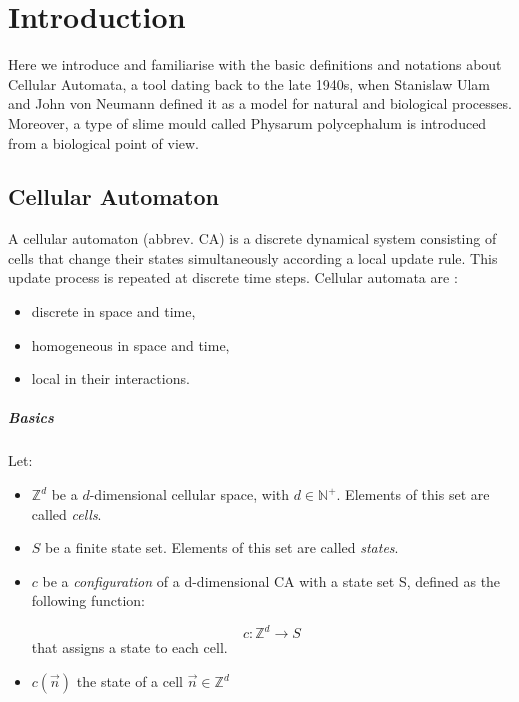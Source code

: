 \chapter{Introduction}

Here we introduce and familiarise with the basic definitions and notations about Cellular Automata, a tool dating back to the late 1940s, when Stanislaw Ulam and John von Neumann defined it as a model for natural and biological processes. Moreover, a type of slime mould called Physarum polycephalum is introduced from a biological point of view.

\section{Cellular Automaton}
\label{ca}

A cellular automaton (abbrev. CA) is a discrete dynamical system consisting of cells that change their states simultaneously according a local update rule. This update process is repeated at discrete time steps.
Cellular automata are \cite{canotes}:

\begin{itemize}
	\item discrete in space and time,
	\item homogeneous in space and time,
	\item local in their interactions.
\end{itemize}


\paragraph{Basics}

Let:

\begin{itemize}

	\item $\mathds{Z}^{d}$ be a $d$-dimensional cellular space, with $d \in \mathds{N}^{+}$. Elements of this set are called \textit{cells}.

	\item $S$ be a finite state set. Elements of this set are called \textit{states}.

	\item $c$ be a \textit{configuration} of a d-dimensional CA with a state set S, defined as the following function:

	$$c: \mathds{Z}^d \rightarrow S$$
	that assigns a state to each cell.

	\item $c(\vec{n })$ the state of a cell $\vec{n} \in \mathds{Z}^d$

\end{itemize}


